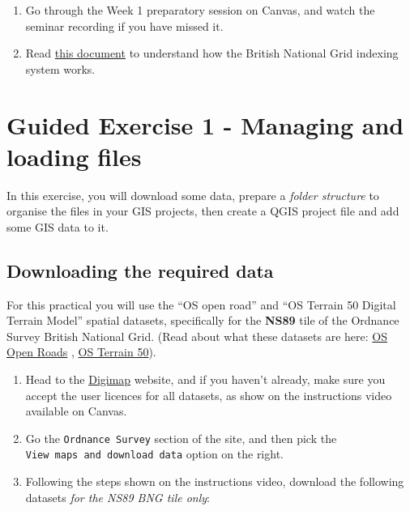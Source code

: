 \documentclass[
  letterpaper,
  DIV=11,
  numbers=noendperiod]{scrreprt}
\begin{document}
\begin{enumerate}
\def\labelenumi{(\arabic{enumi})}
\item
  Go through the Week 1 preparatory session on Canvas, and watch the
  seminar recording if you have missed it.
\item
  Read
  \href{https://www.ordnancesurvey.co.uk/documents/resources/guide-to-nationalgrid.pdf}{this
  document} to understand how the British National Grid indexing system
  works.
\end{enumerate}

\section{Guided Exercise 1 - Managing and loading files}\label{GE1}

In this exercise, you will download some data, prepare a \emph{folder
structure} to organise the files in your GIS projects, then create a
QGIS project file and add some GIS data to it.

\subsection{Downloading the required
data}\label{downloading-the-required-data}

For this practical you will use the ``OS open road'' and ``OS Terrain 50
Digital Terrain Model'' spatial datasets, specifically for the
\textbf{NS89} tile of the Ordnance Survey British National Grid. (Read
about what these datasets are here:
\href{https://www.ordnancesurvey.co.uk/products/os-open-roads}{OS Open
Roads} ,
\href{https://www.ordnancesurvey.co.uk/products/os-terrain-50}{OS
Terrain 50}).

\begin{enumerate}
\def\labelenumi{(\arabic{enumi})}
\setcounter{enumi}{2}
\item
  Head to the \href{https://digimap.edina.ac.uk/}{Digimap} website, and
  if you haven't already, make sure you accept the user licences for all
  datasets, as show on the instructions video available on Canvas.
\item
  Go the \texttt{Ordnance\ Survey} section of the site, and then pick
  the \texttt{View\ maps\ and\ download\ data} option on the right.
\item
  Following the steps shown on the instructions video, download the
  following datasets \emph{for the NS89 BNG tile only}:
\end{enumerate}
\end{document}
